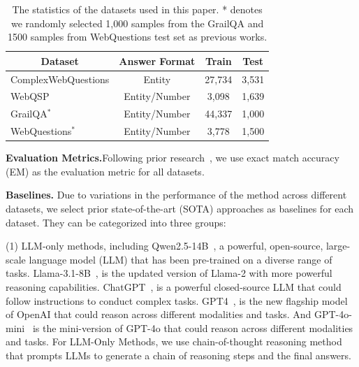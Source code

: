\documentclass[lettersize,journal]{IEEEtran}
\begin{document}
\begin{table}[h]
\centering
\caption{The statistics of the datasets used in this paper. * denotes we randomly selected 1,000 samples from the GrailQA and 1500 samples from WebQuestions test set as previous works.}
\begin{tabular}{lccc}
\toprule
\multicolumn{1}{c}{\textbf{Dataset}}     & \textbf{Answer Format} & \textbf{Train}              & \textbf{Test}              \\ \midrule
\multicolumn{1}{l|}{ComplexWebQuestions} & Entity                 & \multicolumn{1}{c|}{27,734} & \multicolumn{1}{c}{3,531}                \\
\multicolumn{1}{l|}{WebQSP}              & Entity/Number          & \multicolumn{1}{c|}{3,098}  & \multicolumn{1}{c}{1,639}        \\
\multicolumn{1}{l|}{GrailQA$^{*}$}             & Entity/Number          & \multicolumn{1}{c|}{44,337} & \multicolumn{1}{c}{1,000}                 \\
\multicolumn{1}{l|}{WebQuestions$^{*}$}        & Entity/Number          & \multicolumn{1}{c|}{3,778}  & \multicolumn{1}{c}{1,500}        \\ \bottomrule
\end{tabular}
\label{tab_a1}
\end{table}

\noindent \textbf{Evaluation Metrics.}Following prior research~\cite{li2023chain, baek2023knowledge}, we use exact match accuracy (EM) as the evaluation metric for all datasets.

\noindent \textbf{Baselines.} Due to variations in the performance of the method across different datasets, we select prior state-of-the-art (SOTA) approaches as baselines for each dataset. They can be categorized into three groups: 

(1) LLM-only methods, including Qwen2.5-14B~\cite{yang2024qwen2}, a powerful, open-source, large-scale language model (LLM) that has been pre-trained on a diverse range of tasks. Llama-3.1-8B~\cite{llama3.1}, is the updated version of Llama-2 with more powerful reasoning capabilities. ChatGPT~\cite{chatgpt}, is a powerful closed-source LLM that could follow instructions to conduct complex tasks. GPT4~\cite{gpt4}, is the new flagship model of OpenAI that could reason across different modalities and tasks. And GPT-4o-mini~\cite{4o-mini} is the mini-version of GPT-4o that could reason across different modalities and tasks. For LLM-Only Methods, we use chain-of-thought reasoning method~\cite{wei2022chain} that prompts LLMs to generate a chain of reasoning steps and the final answers. 
\end{document}
